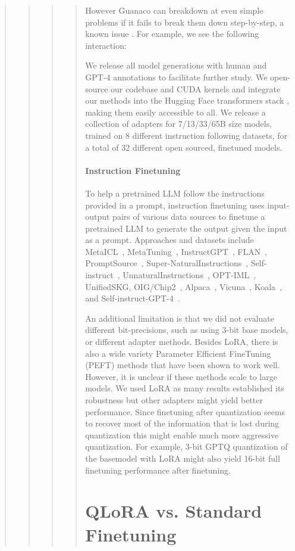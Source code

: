\begin{quote}
\begin{quote}
\begin{quote}
\begin{quote}
However {Guanaco} can breakdown at even simple problems if it fails to break them down step-by-step, a known issue \cite{weichain}. For example, we see the following interaction:

We release all model generations with human and GPT-4 annotations to facilitate further study. We open-source our codebase and CUDA kernels and integrate our methods into the Hugging Face transformers stack \citep{wolf2019huggingface}, making them easily accessible to all. We release a collection of adapters for 7/13/33/65B size models, trained on 8 different instruction following datasets, for a total of 32 different open sourced, finetuned models.

\paragraph{Instruction Finetuning} To help a pretrained LLM follow the instructions provided in a prompt, instruction finetuning uses input-output pairs of various data sources to finetune a pretrained LLM to generate the output given the input as a prompt. Approaches and datasets include MetaICL~\citep{min2021metaicl}, MetaTuning~\citep{zhong2021adapting}, InstructGPT~\citep{ouyang2022training}, FLAN~\citep{wei2021finetuned,chung2022scaling}, PromptSource~\citep{bach2022promptsource}, Super-NaturalInstructions~\citep{wang2022super,sanh2021multitask}, Self-instruct~\citep{wang2022self}, UnnaturalInstructions~\citep{honovich2022unnatural}, OPT-IML~\citep{iyer2022opt}, UnifiedSKG\citep{xie2022unifiedskg}, OIG/Chip2~\citep{laion2023}, Alpaca~\citep{alpaca}, Vicuna~\citep{vicuna2023}, Koala~\citep{koala_blogpost_2023}, and Self-instruct-GPT-4~\citep{peng2023instruction}.

An additional limitation is that we did not evaluate different bit-precisions, such as using 3-bit base models, or different adapter methods. Besides LoRA, there is also a wide variety Parameter Efficient FineTuning (PEFT) methods that have been shown to work well. However, it is unclear if these methods scale to large models. We used LoRA as many results established its robustness but other adapters might yield better performance. Since finetuning after quantization seems to recover most of the information that is lost during quantization this might enable much more aggressive quantization. For example, 3-bit GPTQ quantization of the basemodel with LoRA might also yield 16-bit full finetuning performance after finetuning.

\section{QLoRA vs. Standard Finetuning}
\label{sec:comp_to_std}


\end{quote}
\end{quote}
\end{quote}
\end{quote}
